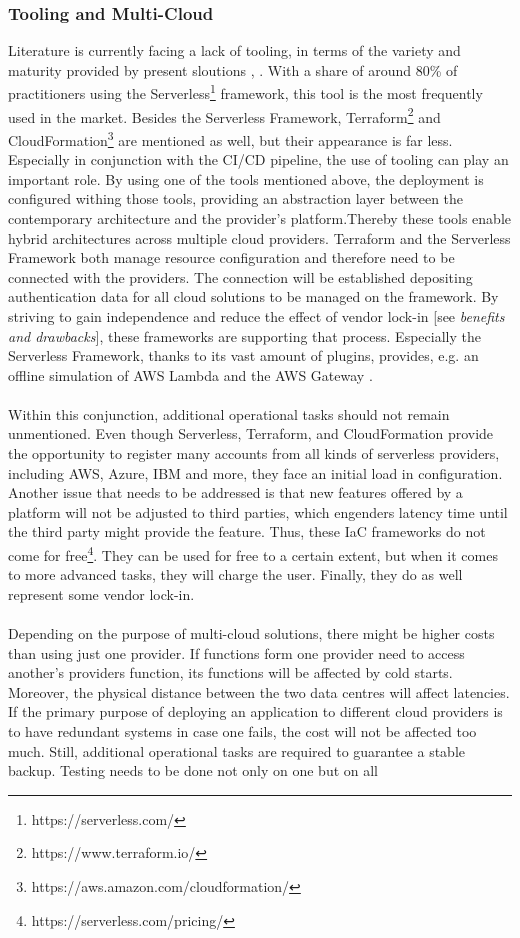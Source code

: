 \documentclass[a4paper,twoside,11pt, pagesize]{scrartcl}
\begin{document}
\subsubsection{Tooling and Multi-Cloud}
Literature is currently facing a lack of tooling, in terms of the variety and maturity provided by present sloutions \cite{Yussupov2019_SystematicMappingStudyFaaS}, \cite{leitner2019mixed}. With a share of around 80\% \cite{leitner2019mixed} of practitioners using the Serverless\footnote{https://serverless.com/} framework, this tool is the most frequently used in the market. Besides the Serverless Framework, Terraform\footnote{https://www.terraform.io/} and CloudFormation\footnote{https://aws.amazon.com/cloudformation/} are mentioned as well, but their appearance is far less. Especially in conjunction with the CI/CD pipeline, the use of tooling can play an important role. By using one of the tools mentioned above, the deployment is configured withing those tools, providing an abstraction layer between the contemporary architecture and the provider's platform.Thereby these tools enable hybrid architectures across multiple cloud providers. Terraform and the Serverless Framework both manage resource configuration and therefore need to be connected with the providers. The connection will be established depositing authentication data for all cloud solutions to be managed on the framework. By striving to gain independence and reduce the effect of vendor lock-in [see \textit{benefits and drawbacks}], these frameworks are supporting that process. Especially the Serverless Framework, thanks to its vast amount of plugins, provides, e.g. an offline simulation of AWS Lambda and the AWS Gateway \cite{lin2018tracking}.\\\\ Within this conjunction, additional operational tasks should not remain unmentioned. Even though Serverless, Terraform, and CloudFormation provide the opportunity to register many accounts from all kinds of serverless providers, including AWS, Azure, IBM and more, they face an initial load in configuration. Another issue that needs to be addressed is that new features offered by a platform will not be adjusted to third parties, which engenders latency time until the third party might provide the feature. Thus, these IaC frameworks do not come for free\footnote{https://serverless.com/pricing/}. They can be used for free to a certain extent, but when it comes to more advanced tasks, they will charge the user. Finally, they do as well represent some vendor lock-in.\\\\ Depending on the purpose of multi-cloud solutions, there might be higher costs than using just one provider. If functions form one provider need to access another's providers function, its functions will be affected by cold starts. Moreover, the physical distance between the two data centres will affect latencies. If the primary purpose of deploying an application to different cloud providers is to have redundant systems in case one fails, the cost will not be affected too much. Still, additional operational tasks are required to guarantee a stable backup. Testing needs to be done not only on one but on all 
\end{document}
